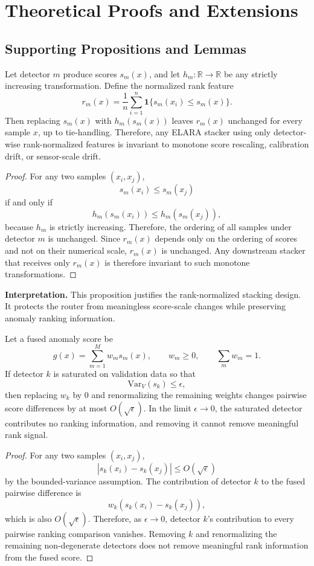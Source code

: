 \section{Theoretical Proofs and Extensions}
\label{sec:theory_appendix}

\subsection{Supporting Propositions and Lemmas}

\begin{proposition}
\label{prop:rank_invariance}
Let detector $m$ produce scores $s_m(x)$, and let $h_m:\mathbb{R}\to\mathbb{R}$ be any strictly increasing transformation. Define the normalized rank feature
\[
r_m(x)=\frac{1}{n}\sum_{i=1}^n \mathbf{1}\{s_m(x_i)\leq s_m(x)\}.
\]
Then replacing $s_m(x)$ with $h_m(s_m(x))$ leaves $r_m(x)$ unchanged for every sample $x$, up to tie-handling. Therefore, any ELARA stacker using only detector-wise rank-normalized features is invariant to monotone score rescaling, calibration drift, or sensor-scale drift.
\end{proposition}
\begin{proof}
For any two samples $(x_i,x_j)$,
\[
s_m(x_i)\leq s_m(x_j)
\]
if and only if
\[
h_m(s_m(x_i))\leq h_m(s_m(x_j)),
\]
because $h_m$ is strictly increasing. Therefore, the ordering of all samples under detector $m$ is unchanged. Since $r_m(x)$ depends only on the ordering of scores and not on their numerical scale, $r_m(x)$ is unchanged. Any downstream stacker that receives only $r_m(x)$ is therefore invariant to such monotone transformations.
\end{proof}

\medskip
\noindent\textbf{Interpretation.}
This proposition justifies the rank-normalized stacking design. It protects the router from meaningless score-scale changes while preserving anomaly ranking information.

\begin{proposition}
\label{prop:degenerate_guard}
Let a fused anomaly score be
\[
g(x)=\sum_{m=1}^M w_m s_m(x),
\qquad w_m\geq 0,\qquad \sum_m w_m=1.
\]
If detector $k$ is saturated on validation data so that
\[
\mathrm{Var}_V(s_k)\leq \epsilon,
\]
then replacing $w_k$ by $0$ and renormalizing the remaining weights changes pairwise score differences by at most $O(\sqrt{\epsilon})$. In the limit $\epsilon\to 0$, the saturated detector contributes no ranking information, and removing it cannot remove meaningful rank signal.
\end{proposition}
\begin{proof}
For any two samples $(x_i,x_j)$,
\[
|s_k(x_i)-s_k(x_j)|
\leq
O(\sqrt{\epsilon})
\]
by the bounded-variance assumption. The contribution of detector $k$ to the fused pairwise difference is
\[
w_k(s_k(x_i)-s_k(x_j)),
\]
which is also $O(\sqrt{\epsilon})$. Therefore, as $\epsilon\to 0$, detector $k$'s contribution to every pairwise ranking comparison vanishes. Removing $k$ and renormalizing the remaining non-degenerate detectors does not remove meaningful rank information from the fused score.
\end{proof}

